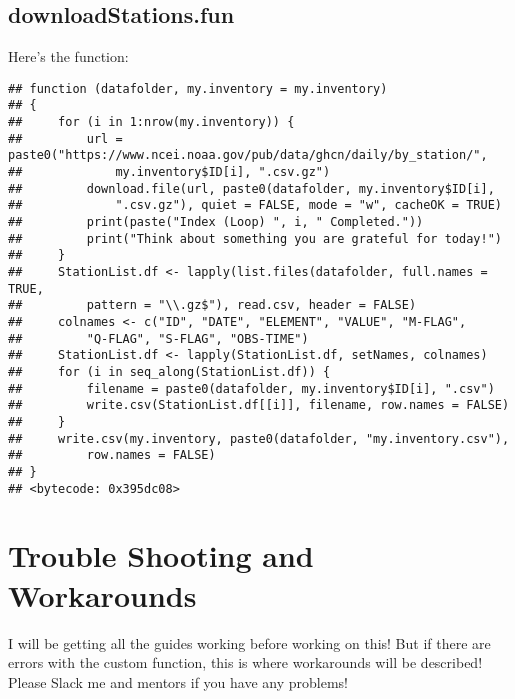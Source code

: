 \documentclass{article}\usepackage[]{graphicx}\usepackage[dvipsnames]{xcolor}
\makeatletter
\newenvironment{kframe}{%
 \def\at@end@of@kframe{}%
 \ifinner\ifhmode%
  \def\at@end@of@kframe{\end{minipage}}%
  \begin{minipage}{\columnwidth}%
 \fi\fi%
 \def\FrameCommand##1{\hskip\@totalleftmargin \hskip-\fboxsep
 \colorbox{shadecolor}{##1}\hskip-\fboxsep
     \hskip-\linewidth \hskip-\@totalleftmargin \hskip\columnwidth}%
 \MakeFramed {\advance\hsize-\width
   \@totalleftmargin\z@ \linewidth\hsize
   \@setminipage}}%
 {\par\unskip\endMakeFramed%
 \at@end@of@kframe}
\newenvironment{knitrout}{}{} %
\makeatother
\begin{document}
\subsection{downloadStations.fun}\label{subsec:downloadStations}

Here's the function:

\begin{knitrout}
\color{fgcolor}\begin{kframe}
\begin{verbatim}
## function (datafolder, my.inventory = my.inventory) 
## {
##     for (i in 1:nrow(my.inventory)) {
##         url = paste0("https://www.ncei.noaa.gov/pub/data/ghcn/daily/by_station/", 
##             my.inventory$ID[i], ".csv.gz")
##         download.file(url, paste0(datafolder, my.inventory$ID[i], 
##             ".csv.gz"), quiet = FALSE, mode = "w", cacheOK = TRUE)
##         print(paste("Index (Loop) ", i, " Completed."))
##         print("Think about something you are grateful for today!")
##     }
##     StationList.df <- lapply(list.files(datafolder, full.names = TRUE, 
##         pattern = "\\.gz$"), read.csv, header = FALSE)
##     colnames <- c("ID", "DATE", "ELEMENT", "VALUE", "M-FLAG", 
##         "Q-FLAG", "S-FLAG", "OBS-TIME")
##     StationList.df <- lapply(StationList.df, setNames, colnames)
##     for (i in seq_along(StationList.df)) {
##         filename = paste0(datafolder, my.inventory$ID[i], ".csv")
##         write.csv(StationList.df[[i]], filename, row.names = FALSE)
##     }
##     write.csv(my.inventory, paste0(datafolder, "my.inventory.csv"), 
##         row.names = FALSE)
## }
## <bytecode: 0x395dc08>
\end{verbatim}
\end{kframe}
\end{knitrout}

\section{Trouble Shooting and Workarounds}

I will be getting all the guides working before working on this! But if there are errors with the custom function, this is where workarounds will be described! Please Slack me and mentors if you have any problems!

\end{document}
